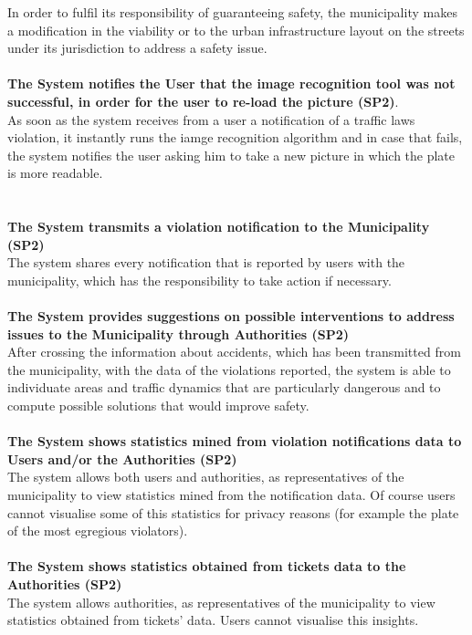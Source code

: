 \documentclass {article}
\begin{document}
		In order to fulfil its responsibility of guaranteeing safety, the municipality makes a modification in the viability or to the urban infrastructure layout on the streets under its jurisdiction to address a safety issue.\\ \\
	{\bf The System notifies the User that the image recognition tool was not successful, in order for the user to re-load the picture (SP2)}. \\
		As soon as the system receives from a user a notification of a traffic laws violation, it instantly runs the iamge recognition algorithm and in case that fails, the system notifies the user asking him to take a new picture in which the plate is more readable. \\ \\ \\
	{\bf The System transmits a violation notification to the Municipality (SP2)} \\
		The system shares every notification that is reported by users with the municipality, which has the responsibility to take action if necessary.\\ \\
	{\bf The System provides suggestions on possible interventions to address issues to the Municipality through Authorities (SP2)} \\
		After crossing the information about accidents, which has been transmitted from the municipality, with the data of the violations reported, the system is able to individuate areas and traffic dynamics that are particularly dangerous and to compute possible solutions that would improve safety. \\ \\
	{\bf The System shows statistics mined from violation notifications data to Users and/or the Authorities (SP2)} \\
		The system allows both users and authorities, as representatives of the municipality to view statistics mined from the notification data. Of course users cannot visualise some of this statistics for privacy reasons (for example the plate of the most egregious violators). \\ \\
	{\bf The System shows statistics obtained from tickets data to the Authorities (SP2)}\\
		The system allows authorities, as representatives of the municipality to view statistics obtained from tickets' data. Users cannot visualise this insights. \\ \\
\end{document}
